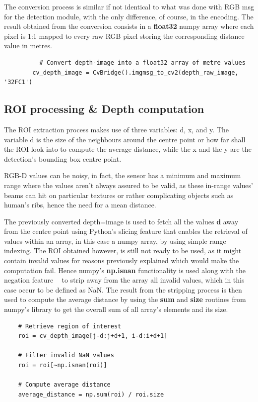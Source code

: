 The conversion process is similar if not identical to what was done with RGB msg for the detection module, with the only difference, of course, in the encoding. The result obtained from the conversion consists in a \textbf{float32} numpy array where each pixel is 1:1 mapped to every raw RGB pixel storing the corresponding distance value in metres.

\begin{lstlisting}
    	  # Convert depth-image into a float32 array of metre values
        cv_depth_image = CvBridge().imgmsg_to_cv2(depth_raw_image, '32FC1')
\end{lstlisting}

\subsection{ROI processing \& Depth computation}

The ROI extraction process makes use of three variables: d, x, and y. The variable d is the size of the neighbours around the centre point or how far shall the ROI look into to compute the average distance, while the x and the y are the detection's bounding box centre point.

RGB-D values can be noisy, in fact, the sensor has a minimum and maximum range where the values aren't always assured to be valid, as these in-range values' beams can hit on particular textures or rather complicating objects such as human's ribs, hence the need for a mean distance.

The previously converted depth=image is used to fetch all the values \textbf{d} away from the centre point using Python's slicing feature that enables the retrieval of values within an array, in this case a numpy array, by using simple range indexing. The ROI obtained however, is still not ready to be used, as it might contain invalid values for reasons previously explained which would make the computation fail. Hence numpy's \textbf{np.isnan} functionality is used along with the negation feature \textbf{~} to strip away from the array all invalid values, which in this case occur to be defined as NaN. The result from the stripping process is then used to compute the average distance by using the \textbf{sum} and \textbf{size} routines from numpy's library to get the overall sum of all array's elements and its size.

\begin{lstlisting}
    # Retrieve region of interest
    roi = cv_depth_image[j-d:j+d+1, i-d:i+d+1]
    
    # Filter invalid NaN values
    roi = roi[~np.isnan(roi)]
    
    # Compute average distance
    average_distance = np.sum(roi) / roi.size
\end{lstlisting}

